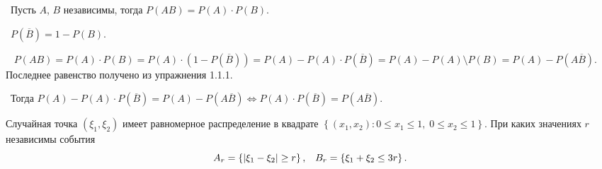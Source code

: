 \begin{solution}

\noindent\textbullet~Пусть $A$, $B$ независимы, тогда $P(AB) = P(A) \cdot  P(B)$.

\smallskip
\noindent\textbullet~$P(\overline{B}) = 1 - P(B)$.

\smallskip
\noindent\textbullet~ $P(AB) = P(A) \cdot P(B) = P(A) \cdot (1 - P(\overline{B})) = P(A) - P(A) \cdot 
P(\overline{B}) = P(A) - P(A) \setminus P(B) = P(A) - P(A\overline{B})$. Последнее равенство получено
из упражнения 1.1.1.

\smallskip
\noindent\textbullet~Тогда $P(A) - P(A) \cdot P(\overline{B}) = P(A) - P(A\overline{B}) \Leftrightarrow
P(A) \cdot P(\overline{B}) = P(A\overline{B})$.
\end{solution}

\medskip
\begin{task}{6}
  Случайная точка $\left(\xi_1, \xi_2\right)$ имеет равномерное распределение в квадрате $\left\{
  \left(x_1, x_2\right) : 0 \le x_1 \le 1, \; 0 \le x_2 \le 1\right\}$. При каких значениях 
  $r$ независимы события 
  \[
    A_r = \left\{\left\lvert\xi_1 - \xi_2\right\rvert \ge r\right\}, \;\;\; B_r = \left\{\xi_1 + \xi_2 \le  3r\right\} 
  .\] 
\end{task}

